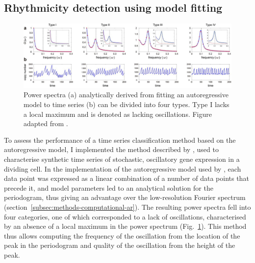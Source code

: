 \subsection{Rhythmicity detection using model fitting}
\label{subsec:analysis-classification-ar}

\begin{figure}
  \centering
  \includegraphics[width=1.0\textwidth]{jiaFrequencyDomainAnalysis2020_2ab_adapted}
  \caption[
    Power spectra analytically derived from fitting an autoregressive model to time series can be divided into four types
  ]{
    Power spectra (a) analytically derived from fitting an autoregressive model to time series (b) can be divided into four types.
    Type I lacks a local maximum and is denoted as lacking oscillations.
    Figure adapted from \textcite{jiaFrequencyDomainAnalysis2020}.
  }
  \label{fig:analysis-ar-classification}
\end{figure}

To assess the performance of a time series classification method based on the autoregressive model, I implemented the method described by \textcite{jiaFrequencyDomainAnalysis2020}, used to characterise synthetic time series of stochastic, oscillatory gene expression in a dividing cell.
In the implementation of the autoregressive model used by \textcite{jiaFrequencyDomainAnalysis2020}, each data point was expressed as a linear combination of a number of data points that precede it, and model parameters led to an analytical solution for the periodogram, thus giving an advantage over the low-resolution Fourier spectrum (section~\ref{subsec:methods-computational-ar}).
The resulting power spectra fell into four categories, one of which corresponded to a lack of oscillations, characterised by an absence of a local maximum in the power spectrum (Fig.\ \ref{fig:analysis-ar-classification}).
This method thus allows computing the frequency of the oscillation from the location of the peak in the periodogram and quality of the oscillation from the height of the peak.

